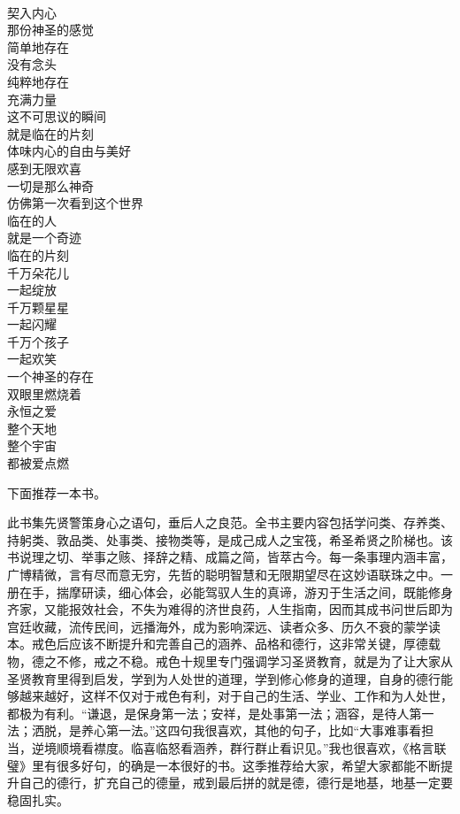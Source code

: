\begin{poem}[神圣的临在]
    \begin{multicols}{3}
        \begin{center}~\\
            契入内心 \\ 那份神圣的感觉 \\ 简单地存在 \\ 没有念头 \\ 纯粹地存在 \\ 充满力量 \\ 这不可思议的瞬间 \\ 就是临在的片刻 \\ 体味内心的自由与美好 \\ 感到无限欢喜 \\ 一切是那么神奇 \\ 仿佛第一次看到这个世界 \\ 临在的人 \\ 就是一个奇迹 \\ 临在的片刻 \\ 千万朵花儿 \\ 一起绽放 \\ 千万颗星星 \\ 一起闪耀 \\ 千万个孩子 \\ 一起欢笑 \\ 一个神圣的存在 \\ 双眼里燃烧着 \\ 永恒之爱 \\ 整个天地 \\ 整个宇宙 \\ 都被爱点燃
        \end{center}
    \end{multicols}
\end{poem}

下面推荐一本书。

\begin{book}[《格言联璧》]
    此书集先贤警策身心之语句，垂后人之良范。全书主要内容包括学问类、存养类、持躬类、敦品类、处事类、接物类等，是成己成人之宝筏，希圣希贤之阶梯也。该书说理之切、举事之赅、择辞之精、成篇之简，皆萃古今。每一条事理内涵丰富，广博精微，言有尽而意无穷，先哲的聪明智慧和无限期望尽在这妙语联珠之中。一册在手，揣摩研读，细心体会，必能驾驭人生的真谛，游刃于生活之间，既能修身齐家，又能报效社会，不失为难得的济世良药，人生指南，因而其成书问世后即为宫廷收藏，流传民间，远播海外，成为影响深远、读者众多、历久不衰的蒙学读本。戒色后应该不断提升和完善自己的涵养、品格和德行，这非常关键，厚德载物，德之不修，戒之不稳。戒色十规里专门强调学习圣贤教育，就是为了让大家从圣贤教育里得到启发，学到为人处世的道理，学到修心修身的道理，自身的德行能够越来越好，这样不仅对于戒色有利，对于自己的生活、学业、工作和为人处世，都极为有利。“谦退，是保身第一法；安祥，是处事第一法；涵容，是待人第一法；洒脱，是养心第一法。”这四句我很喜欢，其他的句子，比如“大事难事看担当，逆境顺境看襟度。临喜临怒看涵养，群行群止看识见。”我也很喜欢，《格言联璧》里有很多好句，的确是一本很好的书。这季推荐给大家，希望大家都能不断提升自己的德行，扩充自己的德量，戒到最后拼的就是德，德行是地基，地基一定要稳固扎实。
\end{book}
